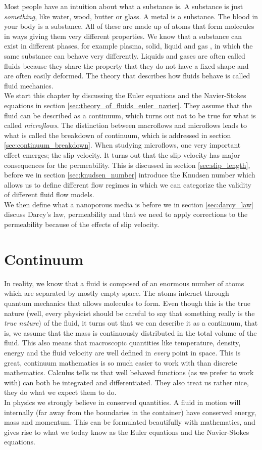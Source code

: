 Most people have an intuition about what a substance is. A substance is just \textit{something}, like water, wood, butter or glass. A metal is a substance. The blood in your body is a substance. All of these are made up of atoms that form molecules in ways giving them very different properties. We know that a substance can exist in different phases, for example plasma, solid, liquid and gas \cite{ravndal2008statmech}, in which the same substance can behave very differently. Liquids and gases are often called fluids because they share the property that they do not have a fixed shape and are often easily deformed. The theory that describes how fluids behave is called fluid mechanics.\\
We start this chapter by discussing the Euler equations and the Navier-Stokes equations in section \ref{sec:theory_of_fluids_euler_navier}. They assume that the fluid can be described as a continuum, which turns out not to be true for what is called \textit{microflows}. The distinction between macroflows and microflows leads to what is called the breakdown of continuum, which is addressed in section \ref{sec:continuum_breakdown}. When studying microflows, one very important effect emerges; the slip velocity. It turns out that the slip velocity has major consequences for the permeability. This is discussed in section \ref{sec:slip_length}, before we in section \ref{sec:knudsen_number} introduce the Knudsen number which allows us to define different flow regimes in which we can categorize the validity of different fluid flow models.\\
We then define what a nanoporous media is before we in section \ref{sec:darcy_law} discuss Darcy's law, permeability and that we need to apply corrections to the permeability because of the effects of slip velocity.

\section{Continuum}
\label{sec:continuum}
In reality, we know that a fluid is composed of an enormous number of atoms which are separated by mostly empty space. The atoms interact through quantum mechanics that allows molecules to form. Even though this is the true nature (well, every physicist should be careful to say that something really is the \textit{true nature}) of the fluid, it turns out that we can describe it as a continuum, that is, we assume that the mass is continuously distributed in the total volume of the fluid. This also means that macroscopic quantities like temperature, density, energy and the fluid velocity are well defined in \textit{every} point in space. This is great, continuum mathematics is so much easier to work with than discrete mathematics. Calculus tells us that well behaved functions (as we prefer to work with) can both be integrated and differentiated. They also treat us rather nice, they do what we expect them to do.\\
In physics we strongly believe in conserved quantities. A fluid in motion will internally (far away from the boundaries in the container) have conserved energy, mass and momentum. This can be formulated beautifully with mathematics, and gives rise to what we today know as the Euler equations and the Navier-Stokes equations.
